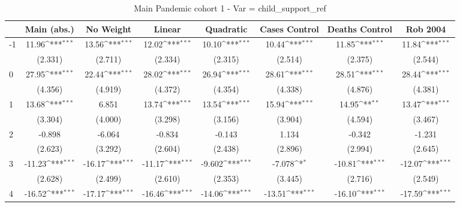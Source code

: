 \documentclass{article}
\begin{document}
{
\def\sym#1{\ifmmode^{#1}\else\(^{#1}\)\fi}
\begin{longtable}{l*{7}{c}}
\caption{Main Pandemic cohort 1 - Var = child\_support\_ref}\\
\hline\hline\endfirsthead\hline\endhead\hline\endfoot\endlastfoot
                &\multicolumn{1}{c}{Main (abs.)}&\multicolumn{1}{c}{No Weight}&\multicolumn{1}{c}{Linear}&\multicolumn{1}{c}{Quadratic}&\multicolumn{1}{c}{Cases Control}&\multicolumn{1}{c}{Deaths Control}&\multicolumn{1}{c}{Rob 2004}\\
\hline
-1              &    11.96\sym{***}&    13.56\sym{***}&    12.02\sym{***}&    10.10\sym{***}&    10.44\sym{***}&    11.85\sym{***}&    11.84\sym{***}\\
                &  (2.331)         &  (2.711)         &  (2.334)         &  (2.315)         &  (2.514)         &  (2.375)         &  (2.544)         \\
0               &    27.95\sym{***}&    22.44\sym{***}&    28.02\sym{***}&    26.94\sym{***}&    28.61\sym{***}&    28.51\sym{***}&    28.44\sym{***}\\
                &  (4.356)         &  (4.919)         &  (4.372)         &  (4.354)         &  (4.338)         &  (4.876)         &  (4.381)         \\
1               &    13.68\sym{***}&    6.851         &    13.74\sym{***}&    13.54\sym{***}&    15.94\sym{***}&    14.95\sym{**} &    13.47\sym{***}\\
                &  (3.304)         &  (4.000)         &  (3.298)         &  (3.156)         &  (3.904)         &  (4.594)         &  (3.467)         \\
2               &   -0.898         &   -6.064         &   -0.834         &   -0.143         &    1.134         &   -0.342         &   -1.231         \\
                &  (2.623)         &  (3.292)         &  (2.604)         &  (2.438)         &  (2.896)         &  (2.994)         &  (2.645)         \\
3               &   -11.23\sym{***}&   -16.17\sym{***}&   -11.17\sym{***}&   -9.602\sym{***}&   -7.078\sym{*}  &   -10.81\sym{***}&   -12.07\sym{***}\\
                &  (2.628)         &  (2.499)         &  (2.610)         &  (2.353)         &  (3.445)         &  (2.716)         &  (2.549)         \\
4               &   -16.52\sym{***}&   -17.17\sym{***}&   -16.46\sym{***}&   -14.06\sym{***}&   -13.51\sym{***}&   -16.10\sym{***}&   -17.59\sym{***}\\

\end{longtable}}
\end{document}
